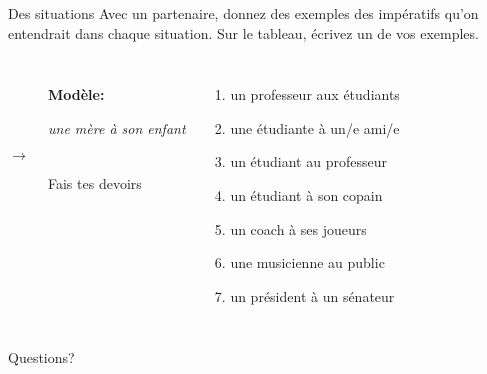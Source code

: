 \documentclass{beamer}
\begin{document}
  \begin{frame}{Des situations}
    Avec un partenaire, donnez des exemples des impératifs qu'on entendrait dans chaque situation.
    Sur le tableau, écrivez un de vos exemples. \\
    \begin{columns}
        \begin{description}
          \item[] \textbf{Modèle:}
          \item[] \emph{une mère à son enfant}
          \item[$\to$] Fais tes devoirs
        \end{description}
        \begin{enumerate}
          \item un professeur aux étudiants
          \item une étudiante à un/e ami/e
          \item un étudiant au professeur
          \item un étudiant à son copain
          \item un coach à ses joueurs
          \item une musicienne au public
          \item un président à un sénateur
        \end{enumerate}
    \end{columns}
  \end{frame}

  \begin{frame}{}
    \begin{center}
      \Large Questions?
    \end{center}
  \end{frame}
\end{document}
